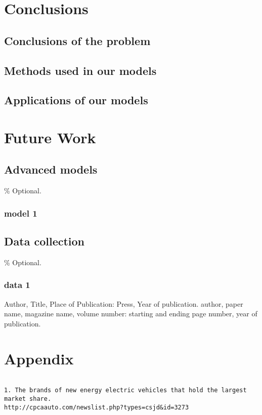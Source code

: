 \documentclass{apmcmthesis}
\begin{document}
\section{Conclusions}

\subsection{Conclusions of the problem}



\subsection{Methods used in our models}



\subsection{Applications of our models}




\section{Future Work}

\subsection{Advanced models}
\% Optional.

\subsubsection{model 1}

\subsection{Data collection}
\% Optional.

\subsubsection{data 1}




\begin{thebibliography}{9}%
 Author, Title, Place of Publication: Press, Year of publication.
 author, paper name, magazine name, volume number: starting and ending
page number, year of publication.

\end{thebibliography}

\newpage

\section{Appendix}

\begin{lstlisting}[caption={Data source}]

1. The brands of new energy electric vehicles that hold the largest market share.
http://cpcaauto.com/newslist.php?types=csjd&id=3273

\end{lstlisting}
\end{document}
